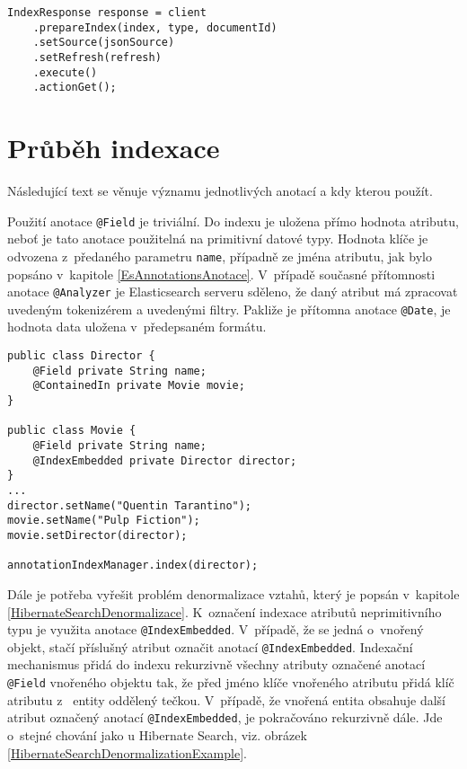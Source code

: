 \documentclass[11pt,oneside]{fithesis2}
\begin{document}
\begin{lstlisting}[caption =  Odeslání požadavku na vytvoření/úpravu indexu, label = EsAnnotationsIndexaceOdeslaniPozadavkuExample]
IndexResponse response = client
	.prepareIndex(index, type, documentId)
	.setSource(jsonSource)
	.setRefresh(refresh)
	.execute()
	.actionGet();
\end{lstlisting}

\newpage

\section{Průběh indexace}
\label{EsAnnotationsIndexacniCast}
Následující text se věnuje významu jednotlivých anotací a kdy kterou použít.

Použití anotace \texttt{@Field} je triviální. Do indexu je uložena přímo hodnota atributu, neboť je tato anotace použitelná na primitivní datové typy. Hodnota klíče je odvozena z~předaného parametru \texttt{name}, případně ze jména atributu, jak bylo popsáno v~kapitole \ref{EsAnnotationsAnotace}. V~případě současné přítomnosti anotace \texttt{@Analyzer} je Elasticsearch serveru sděleno, že daný atribut má zpracovat uvedeným tokenizérem a uvedenými filtry. Pakliže je přítomna anotace \texttt{@Date}, je hodnota data uložena v~předepsaném formátu.

\begin{lstlisting}[caption =  Užití anotací pro indexaci vztahů mezi entitami, label = IndexingRelationsExample]
public class Director {
	@Field private String name;
	@ContainedIn private Movie movie;
}

public class Movie {
	@Field private String name;
	@IndexEmbedded private Director director;	
}
...
director.setName("Quentin Tarantino");
movie.setName("Pulp Fiction");
movie.setDirector(director);

annotationIndexManager.index(director);
\end{lstlisting}

Dále je potřeba vyřešit problém denormalizace vztahů, který je popsán v~kapitole \ref{HibernateSearchDenormalizace}. K~označení indexace atributů neprimitivního typu je využita anotace \texttt{@IndexEmbedded}. V~případě, že se jedná o~vnořený objekt, stačí příslušný atribut označit anotací \texttt{@IndexEmbedded}. Indexační mechanismus přidá do indexu rekurzivně všechny atributy označené anotací \texttt{@Field} vnořeného objektu tak, že před jméno klíče vnořeného atributu přidá klíč atributu z~ entity oddělený tečkou. V~případě, že vnořená entita obsahuje další atribut označený anotací \texttt{@IndexEmbedded}, je pokračováno rekurzivně dále. Jde o~stejné chování jako u Hibernate Search, viz. obrázek \ref{HibernateSearchDenormalizationExample}.
\end{document}
